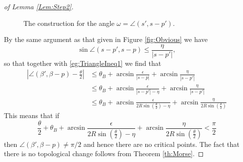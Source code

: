 \documentclass[10pt,a4paper]{amsart}
\begin{document}
\begin{proof}[of Lemma \ref{Lem:Step2}]
\begin{figure}[h!]
    \caption{The construction for the angle $\omega= \angle  ({s}',s- p')$. }
    \label{fig:AngleEst3}
\end{figure}
By the same argument as that given in Figure \ref{fig:Obvious} we have  
\[  \sin \angle  (s-p',s- p)  \leq \frac{\eta}{|s-p'|},
\]
so that together with \eqref{eg:TriangleIneq1} we find that
\begin{align} 
\left |\angle  ({\beta}',\beta- p)  - \frac{\theta}{2}  \right|& \leq  \theta_B + \arcsin \frac{\epsilon} { |s -p| } +\arcsin \frac{\eta} { |s -p'| } 
\nonumber
\\
&\leq \theta_B + \arcsin \frac{\epsilon} { |s -p'| -\eta } +\arcsin \frac{\eta} { |s -p'| } 
\tag{by the triangle inequality} 
\\
&\leq \theta_B + \arcsin \frac{\epsilon} { 2 R \sin (\frac{\theta}{2})  -\eta } +\arcsin \frac{\eta} { 2 R \sin (\frac{\theta}{2})  } 
\nonumber
\end{align} 
This means that if 
\[ \frac{\theta}{2} + \theta_B + \arcsin \frac{\epsilon} { 2 R \sin (\frac{\theta}{2})  -\eta } +\arcsin \frac{\eta} { 2 R \sin (\frac{\theta}{2})  }  <\frac{\pi}{ 2} 
\] 
then  $\angle  ({\beta}',\beta- p) \neq \pi/2 $ and hence there are no critical points. The fact that there is no topological change follows from Theorem \ref{th:Morse}. 
%
%
%
%
%
%
%
%
%
%
%
%
%
%
%
%
%
%
%
%
%
%
%
%
%
%
%
%
%
%
%
%
%
%
%
%
%
%
%
%
%
%
%
%
%
%
\end{proof} 
\end{document}
